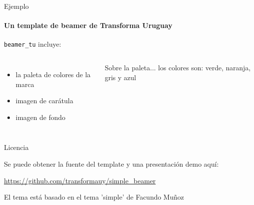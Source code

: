 \documentclass{beamer}
\begin{document}
\begin{frame}{Ejemplo}
  \framesubtitle{Un template de beamer de Transforma Uruguay}

  \texttt{beamer\_tu} incluye: 

  \begin{columns}
      \begin{itemize}
        \item la \alert{paleta de colores} de la marca
        \item imagen de carátula
        \item imagen de fondo
      \end{itemize}

      \begin{block}{Sobre la paleta...}
         los colores son: verde, naranja, gris y azul
      \end{block}
  \end{columns}
  
\end{frame}

\begin{frame}{Licencia}

  \begin{block}{Se puede obtener la fuente del template y una presentación demo aquí:}

  \begin{center}\url{https://github.com/transformauy/simple_beamer}\end{center}

  \end{block}
  
  \begin{block}{El tema está basado en el tema 'simple' de Facundo Muñoz}
  \end{block}
\end{frame}
\end{document}
